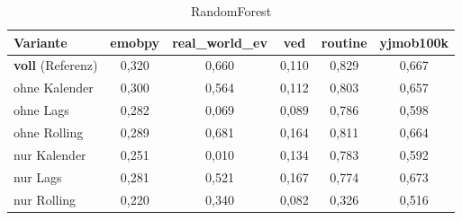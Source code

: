 \begin{table}[H]
    \centering
    \caption{Ablation der Merkmalsgruppen: F1-Score je Datenquelle, zeitlich
    in-distribution. Verworfene Zeilen richten sich in allen Varianten nach dem
    vollständigen Merkmalssatz, sodass je Quelle identische Beobachtungen
    zugrunde liegen. Ergänzt \cref{tab:ablation} (PR-AUC).}
    \label{tab:ablation_f1}

    \begin{subtable}{\textwidth}
        \centering
        \caption{RandomForest}
        \label{tab:ablation_f1_rf}
        \begin{tabular}{lccccc}
            \toprule
            \textbf{Variante} & emobpy & real\_world\_ev & ved & routine & yjmob100k \\
            \midrule
            \textbf{voll} (Referenz)     & 0,320 & 0,660 & 0,110 & 0,829 & 0,667 \\
            \addlinespace
            ohne Kalender                & 0,300 & 0,564 & 0,112 & 0,803 & 0,657 \\
            ohne Lags                    & 0,282 & 0,069 & 0,089 & 0,786 & 0,598 \\
            ohne Rolling                 & 0,289 & 0,681 & 0,164 & 0,811 & 0,664 \\
            \addlinespace
            nur Kalender                 & 0,251 & 0,010 & 0,134 & 0,783 & 0,592 \\
            nur Lags                     & 0,281 & 0,521 & 0,167 & 0,774 & 0,673 \\
            nur Rolling                  & 0,220 & 0,340 & 0,082 & 0,326 & 0,516 \\
            \bottomrule
        \end{tabular}
    \end{subtable}

    \vspace{1em}


\end{table}
